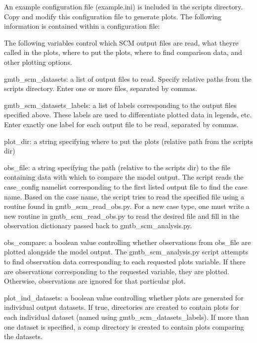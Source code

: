 \begin{DoxyItemize}
\item An example configuration file (example.\+ini) is included in the scripts directory. Copy and modify this configuration file to generate plots. The following information is contained within a configuration file\+:
\begin{DoxyItemize}
\item The following variables control which S\+CM output files are read, what they\textquotesingle{}re called in the plots, where to put the plots, where to find comparison data, and other plotting options.
\begin{DoxyItemize}
\item gmtb\+\_\+scm\+\_\+datasets\+: a list of output files to read. Specify relative paths from the scripts directory. Enter one or more files, separated by commas.
\item gmtb\+\_\+scm\+\_\+datasets\+\_\+labels\+: a list of labels corresponding to the output files specified above. These labels are used to differentiate plotted data in legends, etc. Enter exactly one label for each output file to be read, separated by commas.
\item plot\+\_\+dir\+: a string specifying where to put the plots (relative path from the scripts dir)
\item obs\+\_\+file\+: a string specifying the path (relative to the scripts dir) to the file containing data with which to compare the model output. The script reads the case\+\_\+config namelist corresponding to the first listed output file to find the case name. Based on the case name, the script tries to read the specified file using a routine found in gmtb\+\_\+scm\+\_\+read\+\_\+obs.\+py. For a new case type, one must write a new routine in gmtb\+\_\+scm\+\_\+read\+\_\+obs.\+py to read the desired file and fill in the observation dictionary passed back to gmtb\+\_\+scm\+\_\+analysis.\+py.
\item obs\+\_\+compare\+: a boolean value controlling whether observations from obs\+\_\+file are plotted alongside the model output. The gmtb\+\_\+scm\+\_\+analysis.\+py script attempts to find observation data corresponding to each requested plot\textquotesingle{}s variable. If there are observations corresponding to the requested variable, they are plotted. Otherwise, observations are ignored for that particular plot.
\item plot\+\_\+ind\+\_\+datasets\+: a boolean value controlling whether plots are generated for individual output datasets. If true, directories are created to contain plots for each individual dataset (named using gmtb\+\_\+scm\+\_\+datasets\+\_\+labels). If more than one dataset is specified, a \textquotesingle{}comp\textquotesingle{} directory is created to contain plots comparing the datasets.

\end{DoxyItemize}
\end{DoxyItemize}
\end{DoxyItemize}
